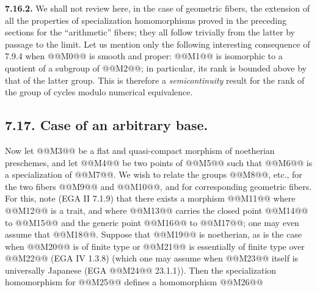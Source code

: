 \textbf{7.16.2.}
We shall not review here, in the case of geometric fibers, the extension of all the properties of specialization homomorphisms proved in the preceding sections for the ``arithmetic'' fibers; they all follow trivially from the latter by passage to the limit. Let us mention only the following interesting consequence of 7.9.4 when @@M0@@ is smooth and proper: @@M1@@ is isomorphic to a quotient of a subgroup of @@M2@@; in particular, its rank is bounded above by that of the latter group. This is therefore a \emph{semicontinuity} result for the rank of the group of cycles modulo numerical equivalence.

\subsection*{7.17. Case of an arbitrary base.}
Now let
@@M3@@
be a flat and quasi-compact morphism of noetherian preschemes, and let @@M4@@ be two points of @@M5@@ such that @@M6@@ is a specialization of @@M7@@. We wish to relate the groups @@M8@@, etc., for the two fibers @@M9@@ and @@M10@@, and for corresponding geometric fibers. For this, note (EGA II 7.1.9) that there exists a morphism
@@M11@@
where @@M12@@ is a trait, and where @@M13@@ carries the closed point @@M14@@ to @@M15@@ and the generic point @@M16@@ to @@M17@@; one may even assume that @@M18@@. Suppose that @@M19@@ is noetherian, as is the case when @@M20@@ is of finite type or @@M21@@ is essentially of finite type over @@M22@@ (EGA IV 1.3.8) (which one may assume when @@M23@@ itself is universally Japanese (EGA @@M24@@ 23.1.1)). Then the specialization homomorphism for @@M25@@ defines a homomorphism
@@M26@@
